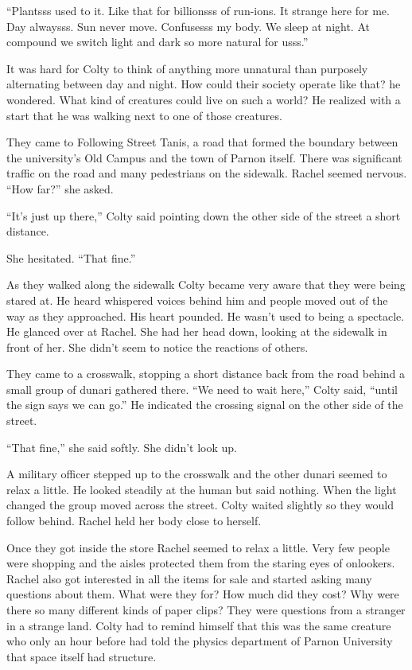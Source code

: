 ``Plantsss used to it. Like that for billionsss of run-ions. It strange here for me. Day
alwaysss. Sun never move. Confusesss my body. We sleep at night. At compound we switch light and
dark so more natural for usss.''

It was hard for Colty to think of anything more unnatural than purposely alternating between day
and night. How could their society operate like that? he wondered. What kind of creatures could
live on such a world? He realized with a start that he was walking next to one of those
creatures.

They came to Following Street Tanis, a road that formed the boundary between the university's
Old Campus and the town of Parnon itself. There was significant traffic on the road and many
pedestrians on the sidewalk. Rachel seemed nervous. ``How far?'' she asked.

``It's just up there,'' Colty said pointing down the other side of the street a short distance.

She hesitated. ``That fine.''

As they walked along the sidewalk Colty became very aware that they were being stared at. He
heard whispered voices behind him and people moved out of the way as they approached. His heart
pounded. He wasn't used to being a spectacle. He glanced over at Rachel. She had her head down,
looking at the sidewalk in front of her. She didn't seem to notice the reactions of others.

They came to a crosswalk, stopping a short distance back from the road behind a small group of
dunari gathered there. ``We need to wait here,'' Colty said, ``until the sign says we can go.''
He indicated the crossing signal on the other side of the street.

``That fine,'' she said softly. She didn't look up.

A military officer stepped up to the crosswalk and the other dunari seemed to relax a little. He
looked steadily at the human but said nothing. When the light changed the group moved across the
street. Colty waited slightly so they would follow behind. Rachel held her body close to
herself.

Once they got inside the store Rachel seemed to relax a little. Very few people were shopping
and the aisles protected them from the staring eyes of onlookers. Rachel also got interested in
all the items for sale and started asking many questions about them. What were they for? How
much did they cost? Why were there so many different kinds of paper clips? They were questions
from a stranger in a strange land. Colty had to remind himself that this was the same creature
who only an hour before had told the physics department of Parnon University that space itself
had structure.

